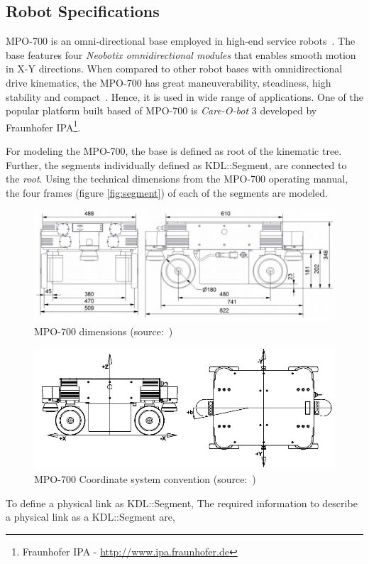 \subsection{Robot Specifications}
MPO-700 is an omni-directional base employed in high-end service robots~\cite{Neobotix-homepage}. The base features four \textit{Neobotix omnidirectional modules} that enables smooth motion in X-Y directions. When compared to other robot bases with omnidirectional drive kinematics, the MPO-700 has great maneuverability, steadiness, high stability and compact~\cite{Neobotix-homepage}. Hence, it is used in wide range of applications. One of the popular platform built based of MPO-700 is \textit{Care-O-bot} 3 developed by Fraunhofer IPA\footnote{Fraunhofer IPA - \url{http://www.ipa.fraunhofer.de}}. 

For modeling the MPO-700, the base is defined as root of the kinematic tree. Further, the segments individually defined as KDL::Segment, are connected to the \textit{root}. Using the technical dimensions from the MPO-700 operating manual, the four frames (figure \ref{fig:segment}) of each of the segments are modeled. 

\begin{figure}[h!]
	\centering
	\includegraphics[scale=0.4]{images/technicaldata}
	\caption{MPO-700 dimensions (source:~\cite{MPO700-Datasheet})}
	\label{fig:Technicaldata}
\end{figure}

\begin{figure}[h!]
	\centering
	\includegraphics[scale=0.4]{images/coordinate}
	\caption{MPO-700 Coordinate system convention (source:~\cite{MPO700})}
	\label{fig:coordinate}
\end{figure}
To define a physical link as KDL::Segment, The required information to describe a physical link as a KDL::Segment are, 



